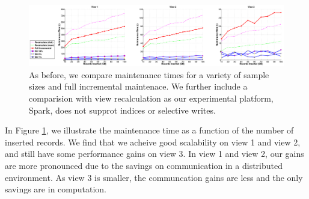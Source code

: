 \begin{figure}[ht!]
\label{exp6conviva}
\hspace{-2em}
\includegraphics[scale=0.23]{exp/exp5-efficiency-conviva.eps}
 \caption{As before, we compare maintenance times for a variety of sample sizes and full incremental maintenace. We further include a comparision with view recalculation as our experimental platform, Spark, does not supprot indices or selective writes.}
\end{figure}

In Figure \ref{exp6conviva}, we illustrate the maintenance time as a function of the number of inserted records.
We find that we acheive good scalability on view 1 and view 2, and still have some performance gains on view 3.
In view 1 and view 2, our gains are more pronounced due to the savings on communication in a distributed environment.
As view 3 is smaller, the communcation gains are less and the only savings are in computation.



